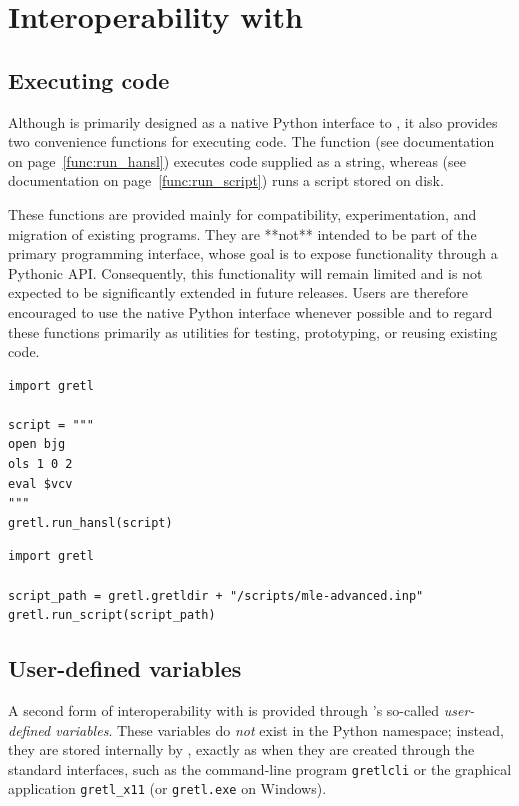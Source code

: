 \section{Interoperability with \hansl}
\subsection{Executing \hansl code}\label{sec:executing hansl_code}
Although \gretlpy is primarily designed as a native Python
interface to \lgretl, it also provides two convenience
functions for executing \hansl code. The function
(see documentation on page~\ref{func:run_hansl})
executes \hansl code supplied as a string, whereas
(see documentation on page~\ref{func:run_script})
runs a \hansl script stored on disk.

These functions are provided mainly for compatibility,
experimentation, and migration of existing \hansl
programs. They are **not** intended to be part of the primary
\gretlpy programming interface, whose goal is to expose
\lgretl functionality through a Pythonic API. Consequently,
this functionality will remain limited and is not expected to
be significantly extended in future releases. Users are
therefore encouraged to use the native Python interface
whenever possible and to regard these functions primarily as
utilities for testing, prototyping, or reusing existing
\hansl code.

\begin{lstlisting}[style=pythonstylefoot]
import gretl

script = """
open bjg
ols 1 0 2
eval $vcv
"""
gretl.run_hansl(script)
\end{lstlisting}

\begin{lstlisting}[style=pythonstylefoot]
import gretl

script_path = gretl.gretldir + "/scripts/mle-advanced.inp"
gretl.run_script(script_path)
\end{lstlisting}


\subsection{User-defined variables}\label{sec:userdefinedvariables}
A second form of interoperability with \hansl is provided
through \lgretl's so-called \textit{user-defined variables}.
These variables do \textit{not} exist in the Python namespace;
instead, they are stored internally by \lgretl, exactly as
when they are created through the standard \gretl interfaces,
such as the command-line program \texttt{gretlcli} or the
graphical application \texttt{gretl\_x11} (or
\texttt{gretl.exe} on Windows).

